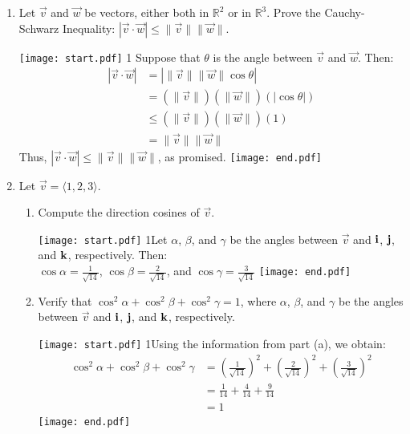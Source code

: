 \documentclass[12pt]{article}
\begin{document}
\begin{enumerate}
\item Let $\overrightarrow{v}$ and $\overrightarrow{w}$ be vectors, either both in $\mathbb{R}^2$ or in $\mathbb{R}^3$.  Prove the Cauchy-Schwarz Inequality: $|\overrightarrow{v}\cdot \overrightarrow{w}|\leq \|\overrightarrow{v}\|\|\overrightarrow{w}\|$.

\texttt{[image: start.pdf]}
{{{1\linewidth}{
Suppose that $\theta$ is the angle between $\overrightarrow{v}$ and $\overrightarrow{w}$.  Then:
\begin{align*}
|\overrightarrow{v}\cdot\overrightarrow{w}|&=\left|\|\overrightarrow{v}\|\|\overrightarrow{w}\|\cos{\theta}\right|\\
&=\left(\|\overrightarrow{v}\|\right)\left(\|\overrightarrow{w}\|\right)\left(|\cos{\theta}|\right)\\
&\leq\left(\|\overrightarrow{v}\|\right)\left(\|\overrightarrow{w}\|\right)(1)\\
&=\|\overrightarrow{v}\| \|\overrightarrow{w}\|
\end{align*}
Thus, $|\overrightarrow{v}\cdot \overrightarrow{w}|\leq \|\overrightarrow{v}\|\|\overrightarrow{w}\|$, as promised.
}}}
\texttt{[image: end.pdf]}


\item Let $\overrightarrow{v}=\langle 1,2,3 \rangle$.

\begin{enumerate}

\item Compute the direction cosines of $\overrightarrow{v}$.

\texttt{[image: start.pdf]}
{{{1\linewidth}{Let $\alpha$, $\beta$, and $\gamma$ be the angles between $\overrightarrow{v}$ and ${\bf i}$, ${\bf j}$, and ${\bf k}$, respectively.  Then:\\ $\cos{\alpha}=\frac{1}{\sqrt{14}}$, $\cos{\beta}=\frac{2}{\sqrt{14}}$, and $\cos{\gamma}=\frac{3}{\sqrt{14}}$}}}
\texttt{[image: end.pdf]}


\item Verify that $\cos^2\alpha+\cos^2\beta+\cos^2\gamma=1$, where $\alpha$, $\beta$, and $\gamma$ be the angles between $\overrightarrow{v}$ and ${\bf i}$, ${\bf j}$, and ${\bf k}$, respectively.

\texttt{[image: start.pdf]}
{{{1\linewidth}{Using the information from part (a), we obtain:
\begin{align*}
\cos^2\alpha+\cos^2\beta+\cos^2\gamma&=\left(\frac{1}{\sqrt{14}}\right)^2+\left(\frac{2}{\sqrt{14}}\right)^2+\left(\frac{3}{\sqrt{14}}\right)^2\\
&=\frac{1}{14}+\frac{4}{14}+\frac{9}{14}\\
&=1
\end{align*}
}}}
\texttt{[image: end.pdf]}


\end{enumerate}

\end{enumerate}
\end{document}
